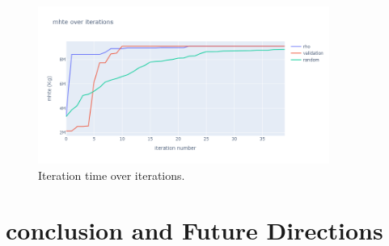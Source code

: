 \documentclass[smallextended,natbib]{svjour3}       %
\numberwithin{definition}{section}
\numberwithin{theorem}{section}
\numberwithin{proposition}{section}
\begin{document}
\begin{figure}[H]
  \centering
  \includegraphics[width=0.85\textwidth]{images/mhte.png}%
  \caption{Iteration time over iterations.}
  \label{fig:iter_time_over_iter}
\end{figure}












\section{conclusion and Future Directions}
\end{document}
